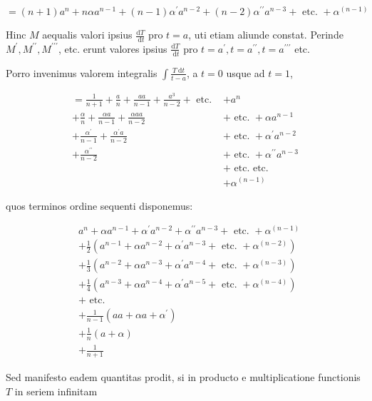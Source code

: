 \documentclass[10pt]{article}
\begin{document}
\[
=(n+1) a^{n}+n \alpha a^{n-1}+(n-1) \alpha^{\prime} a^{n-2}+(n-2) \alpha^{\prime \prime} a^{n-3}+\text { etc. }+\alpha^{(n-1)}
\]

Hinc \(M\) aequalis valori ipsius \(\frac{\mathrm{d} T}{\mathrm{~d} t}\) pro \(t=a\), uti etiam aliunde constat. Perinde \(M^{\prime}, M^{\prime \prime}, M^{\prime \prime \prime}\), etc. erunt valores ipsius \(\frac{\mathrm{d} T}{\mathrm{~d} t}\) pro \(t=a^{\prime}, t=a^{\prime \prime}, t=a^{\prime \prime \prime}\) etc.

Porro invenimus valorem integralis \(\int \frac{T \mathrm{~d} t}{t-a}\), a \(t=0\) usque ad \(t=1\),

\[
\begin{aligned}
=\frac{1}{n+1}+\frac{a}{n}+\frac{a a}{n-1}+\frac{a^{3}}{n-2}+\text { etc. } & +a^{n} \\
+\frac{\alpha}{n}+\frac{\alpha a}{n-1}+\frac{\alpha a a}{n-2} & + \text { etc. }+\alpha a^{n-1} \\
+\frac{\alpha^{\prime}}{n-1}+\frac{\alpha^{\prime} a}{n-2} & + \text { etc. }+\alpha^{\prime} a^{n-2} \\
+\frac{\alpha^{\prime \prime}}{n-2} & + \text { etc. }+\alpha^{\prime \prime} a^{n-3} \\
& + \text { etc. etc. } \\
& +\alpha^{(n-1)}
\end{aligned}
\]

quos terminos ordine sequenti disponemus:

\[
\begin{aligned}
& a^{n}+\alpha a^{n-1}+\alpha^{\prime} a^{n-2}+\alpha^{\prime \prime} a^{n-3}+\text { etc. }+\alpha^{(n-1)} \\
& +\frac{1}{2}\left(a^{n-1}+\alpha a^{n-2}+\alpha^{\prime} a^{n-3}+\text { etc. }+\alpha^{(n-2)}\right) \\
& +\frac{1}{3}\left(a^{n-2}+\alpha a^{n-3}+\alpha^{\prime} a^{n-4}+\text { etc. }+\alpha^{(n-3)}\right) \\
& +\frac{1}{4}\left(a^{n-3}+\alpha a^{n-4}+\alpha^{\prime} a^{n-5}+\text { etc. }+\alpha^{(n-4)}\right) \\
& + \text { etc. } \\
& +\frac{1}{n-1}\left(a a+\alpha a+\alpha^{\prime}\right) \\
& +\frac{1}{n}(a+\alpha) \\
& +\frac{1}{n+1}
\end{aligned}
\]

Sed manifesto eadem quantitas prodit, si in producto e multiplicatione functionis \(T\) in seriem infinitam
\end{document}
